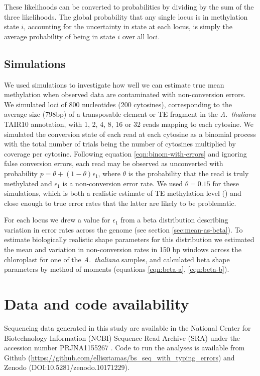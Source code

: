 \documentclass[twocolumn,twoside,lettersize]{article}
\begin{document}
These likelihoods can be converted to probabilities by dividing by the sum of the three likelihoods.
The global probability that any single locus is in methylation state $i$, accounting for the uncertainty in state at each locus, is simply the average probability of being in state $i$ over all loci.

\subsection{Simulations}

We used simulations to investigate how well we can estimate true mean methylation when observed data are contaminated with non-conversion errors.
We simulated loci of 800 nucleotides (200 cytosines), corresponding to the average size (798bp) of a transposable element or TE fragment in the \textit{A.~thaliana} TAIR10 annotation, with 1, 2, 4, 8, 16 or 32 reads mapping to each cytosine.
We simulated the conversion state of each read at each cytosine as a binomial process with the total number of trials being the number of cytosines multiplied by coverage per cytosine.
Following equation \ref{eqn:binom-with-errors} and ignoring false conversion errors, each read may be observed as unconverted with probability $p=\theta + (1-\theta)\epsilon_1$, where $\theta$ is the probability that the read is truly methylated and $\epsilon_1$ is a non-conversion error rate.
We used $\theta=0.15$ for these simulations, which is both a realistic estimate of TE methylation level (\cite{dubin2015dna}) and close enough to true error rates that the latter are likely to be problematic.

For each locus we drew a value for $\epsilon_1$ from a beta distribution describing variation in error rates across the genome (see section \ref{sec:mean-as-beta}).
To estimate biologically realistic shape parameters for this distribution we estimated the mean and variation in non-conversion rates in 150 bp windows across the chloroplast for one of the \emph{A.~thaliana} samples, and calculated beta shape parameters by method of moments (equations \ref{eqn:beta-a}, \ref{eqn:beta-b}).

\section{Data and code availability}

Sequencing data generated in this study are available in the National Center for Biotechnology Information (NCBI) Sequence Read Archive (SRA) under the accession number PRJNA1155267 \parencite{ellis2023datafrom}.
Code to run the analyses is available from Github (\url{https://github.com/ellisztamas/bs_seq_with_typing_errors}) and Zenodo (DOI:10.5281/zenodo.10171229).
\end{document}
